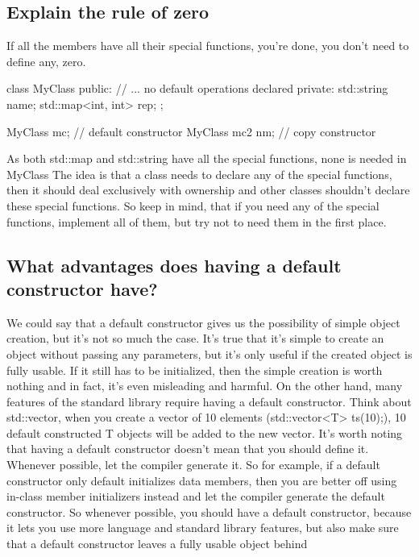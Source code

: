 \documentclass{report}
\begin{document}
\bigbreak \noindent 
\subsection{Explain the rule of zero}
\bigbreak \noindent 
If all the members have all their special functions, you’re done, you don’t need to define any, zero.
\bigbreak \noindent 
\begin{cppcode}
class MyClass {
public:
    // ... no default operations declared
    private:
    std::string name;
    std::map<int, int> rep;
};

MyClass mc; // default constructor
MyClass mc2 {nm}; // copy constructor
\end{cppcode}
\bigbreak \noindent 
As both std::map and std::string have all the special functions, none
is needed in MyClass
\bigbreak \noindent 
The idea is that a class needs to declare any of the special functions,
then it should deal exclusively with ownership and other classes
shouldn’t declare these special functions.
\bigbreak \noindent 
So keep in mind, that if you need any of the special functions,
implement all of them, but try not to need them in the first place.

\bigbreak \noindent 
\subsection{What advantages does having a default constructor have?}
\bigbreak \noindent 

We could say that a default constructor gives us the possibility of
simple object creation, but it’s not so much the case.
\bigbreak \noindent 
It’s true that it’s simple to create an object without passing any
parameters, but it’s only useful if the created object is fully usable. If
it still has to be initialized, then the simple creation is worth nothing
and in fact, it’s even misleading and harmful.
\bigbreak \noindent 
On the other hand, many features of the standard library require
having a default constructor.
\bigbreak \noindent 
Think about std::vector, when you create a vector of 10 elements
(std::vector<T> ts(10);), 10 default constructed T objects will be
added to the new vector.
\bigbreak \noindent 
It’s worth noting that having a default constructor doesn’t mean
that you should define it. Whenever possible, let the compiler
generate it. So for example, if a default constructor only default
initializes data members, then you are better off using in-class member initializers instead and let the compiler generate the default
constructor.
\bigbreak \noindent 
So whenever possible, you should have a default constructor, because it lets you use more language and standard library features,
but also make sure that a default constructor leaves a fully usable
object behind
\end{document}
